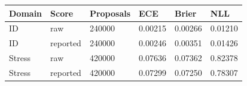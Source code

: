 \begin{tabular}{llllll}
\toprule
Domain & Score & Proposals & ECE & Brier & NLL \\
\midrule
ID & raw & 240000 & 0.00215 & 0.00266 & 0.01210 \\
ID & reported & 240000 & 0.00246 & 0.00351 & 0.01426 \\
Stress & raw & 420000 & 0.07636 & 0.07362 & 0.82378 \\
Stress & reported & 420000 & 0.07299 & 0.07250 & 0.78307 \\
\bottomrule
\end{tabular}
